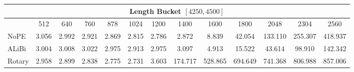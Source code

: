 {\begin{table}[#1]
{\begin{tabular}{l@{\hskip 0.5in}cccccccccccc}
\multicolumn{13}{c}{Length Bucket $[4250, 4500]$} \\
\midrule
 & 512 & 640 & 760 & 878 & 1024 & 1200 & 1400 & 1600 & 1800 & 2048 & 2304 & 2560 \\
 \cmidrule{2-13}
NoPE & 3.056 & 2.992 & 2.921 & 2.869 & 2.815 & 2.786 & 2.872 & 8.839 & 42.054 & 133.110 & 255.307 & 418.937 \\
ALiBi & 3.004 & 3.008 & 3.022 & 2.975 & 2.913 & 2.975 & 3.097 & 4.913 & 15.522 & 43.614 & 98.910 & 142.342 \\
Rotary & 2.958 & 2.899 & 2.838 & 2.775 & 2.731 & 3.603 & 174.717 & 528.865 & 694.649 & 741.368 & 806.988 & 857.006 \\

            \bottomrule
        \end{tabular}
    }
    \label{tab:pretraining:ppl2}
\end{table}{}
}